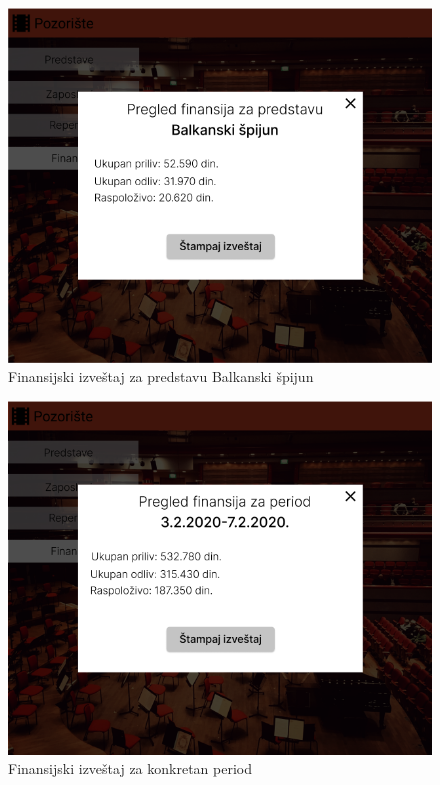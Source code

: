 \documentclass[a4paper]{article}
\begin{document}
\begin{figure}[H]
  \begin{center}
    \includegraphics[width=130mm]{../images/supervizor_finansije_izvestaj2.png}
  \end{center}
  \caption{Finansijski izveštaj za predstavu Balkanski špijun }
  \label{supervizor_finansije_izvestaj2}
\end{figure}

\begin{figure}[H]
  \begin{center}
    \includegraphics[width=130mm]{../images/supervizor_finansije_izvestaj3.png}
  \end{center}
  \caption{Finansijski izveštaj za konkretan period}
  \label{supervizor_finansije_izvestaj3}
\end{figure}
\end{document}
